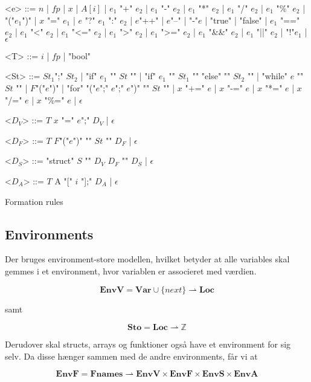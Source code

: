\begin{Grammar}
 \begin{grammar}

 <e> ::= $n$ | $fp$ | $x$ | $A[i]$ | $e_1$ "+" $e_2$ | $e_1$ "-" $e_2$ | $e_1$ "*" $e_2$ | $e_1$ "/" $e_2$ | $e_1$ "\%" $e_2$ | "("$e_1$")" | $x$ "=" $e_1$ | $e$ "?" $e_1$ ":" $e_2$ | $e$"++" | $e$"--" | "-"$e$ | "true" | "false" | $e_1$ "==" $e_2$ | $e_1$ "<" $e_2$ | $e_1$ "<=" $e_2$ | $e_1$ ">" $e_2$ | $e_1$ ">=" $e_2$ | $e_1$ "\&\&" $e_2$ | $e_1$ "||" $e_2$ | "!"$e_1$ | $\epsilon$

 <T> ::= $i$ | $fp$ | "bool"
 
 <St> ::= $St_1$";" $St_2$ | "if" $e_1$ "{" $St$ "}" | "if" $e_1$ "{" $St_1$ "}" "else" "{" $St_2$ "}" | "while" $e$ "{" $St$ "}" | $F$"("$e$")" | "for" "("$e$";" $e$";" $e$")" "{" $St$ "}" | $x$ "+=" $e$ | $x$ "-=" $e$ | $x$ "*=" $e$ | $x$ "/=" $e$ | $x$ "\%=" $e$ | $\epsilon$
 
 <$D_V$> ::= $T$ $x$ "=" $e$";" $D_V$ | $\epsilon$
 
 <$D_F$> ::= $T$ $F$"("$e$")" "{" $St$ "}" $D_F$ | $\epsilon$
 
 <$D_S$> ::= "struct" $S$ "{" $D_V$ $D_F$ "}" $D_S$ | $\epsilon$
 
 <$D_A$> ::= $T$ A "[" $i$ "];" $D_A$ | $\epsilon$

  
 \end{grammar}
 \caption{Formation rules}\label{gra:formationrules}
\end{Grammar}

\subsection{Environments}

Der bruges environment-store modellen, hvilket betyder at alle variables skal gemmes i et environment, hvor variablen er associeret med værdien.

$$ \textbf{EnvV} = \textbf{Var} \cup \{next\} \rightharpoonup \textbf{Loc} $$

\noindent samt

$$ \textbf{Sto} = \textbf{Loc} \rightharpoonup \mathds{Z} $$

\noindent Derudover skal structs, arrays og funktioner også have et environment for sig selv. Da disse hænger sammen med de andre environments, får vi at

$$ \textbf{EnvF} = \textbf{Fnames} \rightharpoonup \textbf{EnvV} \times \textbf{EnvF} \times \textbf{EnvS} \times \textbf{EnvA} $$

